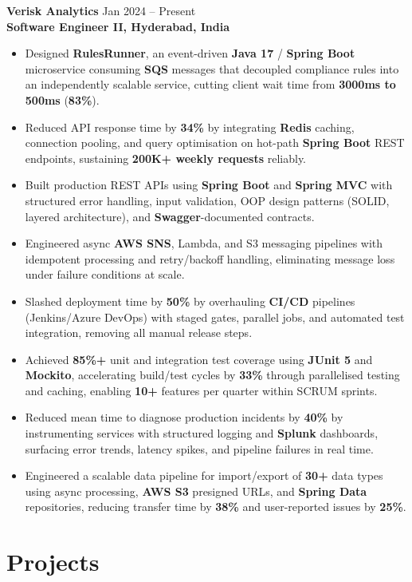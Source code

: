\documentclass[a4paper,10pt]{article}
\begin{document}
\textbf{Verisk Analytics} \hfill Jan 2024 -- Present \\
\textbf{Software Engineer II, Hyderabad, India}
\begin{itemize}[leftmargin=*]
    \item Designed \textbf{RulesRunner}, an event-driven \textbf{Java 17} / \textbf{Spring Boot} microservice consuming \textbf{SQS} messages that decoupled compliance rules into an independently scalable service, cutting client wait time from \textbf{3000ms to 500ms} (\textbf{83\%}).
    \item Reduced API response time by \textbf{34\%} by integrating \textbf{Redis} caching, connection pooling, and query optimisation on hot-path \textbf{Spring Boot} REST endpoints, sustaining \textbf{200K+ weekly requests} reliably.
    \item Built production REST APIs using \textbf{Spring Boot} and \textbf{Spring MVC} with structured error handling, input validation, OOP design patterns (SOLID, layered architecture), and \textbf{Swagger}-documented contracts.
    \item Engineered async \textbf{AWS SNS}, Lambda, and S3 messaging pipelines with idempotent processing and retry/backoff handling, eliminating message loss under failure conditions at scale.
    \item Slashed deployment time by \textbf{50\%} by overhauling \textbf{CI/CD} pipelines (Jenkins/Azure DevOps) with staged gates, parallel jobs, and automated test integration, removing all manual release steps.
    \item Achieved \textbf{85\%+} unit and integration test coverage using \textbf{JUnit 5} and \textbf{Mockito}, accelerating build/test cycles by \textbf{33\%} through parallelised testing and caching, enabling \textbf{10+} features per quarter within SCRUM sprints.
    \item Reduced mean time to diagnose production incidents by \textbf{40\%} by instrumenting services with structured logging and \textbf{Splunk} dashboards, surfacing error trends, latency spikes, and pipeline failures in real time.
    \item Engineered a scalable data pipeline for import/export of \textbf{30+} data types using async processing, \textbf{AWS S3} presigned URLs, and \textbf{Spring Data} repositories, reducing transfer time by \textbf{38\%} and user-reported issues by \textbf{25\%}.
\end{itemize}

\section*{Projects}
\end{document}
